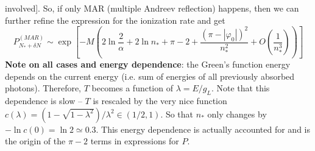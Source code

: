 \begin{enumerate}
	involved{]}. So, if only MAR (multiple Andreev reflection) happens,
	then we can further refine the expression for the ionization rate
	and get
	\begin{equation}
	P_{N_{*}+\delta N}^{(MAR)}\sim\exp\left[-M\left(2\ln\frac{2}{\alpha}+2\ln n_{*}+\pi-2+\frac{(\pi-|\varphi_{0}|)^{2}}{n_{*}^{2}}+O\left(\frac{1}{n_{*}^{3}}\right)\right)\right]
	\end{equation}
	\linebreak{}
	\textbf{Note on all cases and energy dependence}: the Green's function
	energy depends on the current energy (i.e. sum of energies of all
	previously absorbed photons). Therefore, $T$ becomes a function of
	$\lambda=E/g_{L}$. Note that this dependence is slow -- $T$ is
	rescaled by the very nice function $c(\lambda)=(1-\sqrt{1-\lambda^{2}})/\lambda^{2}\in(1/2,1)$.
	So that $n_{*}$ only changes by $-\ln c(0)=\ln2\simeq0.3$. This
	energy dependence is actually accounted for and is the origin of the
	$\pi-2$ terms in expressions for $P$.
\end{enumerate}

